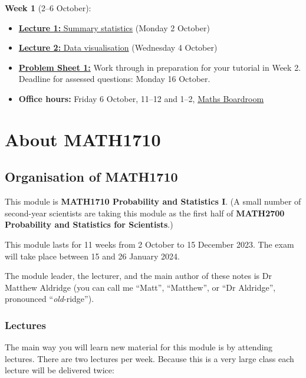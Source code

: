 \documentclass[
  a4paper,
]{book}
\providecommand{\tightlist}{%
  \setlength{\itemsep}{0pt}\setlength{\parskip}{0pt}}
\theoremstyle{definition}
\theoremstyle{definition}
\theoremstyle{definition}
\theoremstyle{definition}
\theoremstyle{remark}
\begin{document}
\textbf{Week 1} (2--6 October):

\begin{itemize}
\tightlist
\item
  \protect\hyperlink{L01-stats}{\textbf{Lecture 1:} Summary statistics} (Monday 2 October)
\item
  \protect\hyperlink{L02-dataviz}{\textbf{Lecture 2:} Data visualisation} (Wednesday 4 October)
\item
  \protect\hyperlink{P1}{\textbf{Problem Sheet 1:}} Work through in preparation for your tutorial in Week 2. Deadline for assessed questions: Monday 16 October.
\item
  \textbf{Office hours:} Friday 6 October, 11--12 and 1--2, \href{boardroom.png}{Maths Boardroom}
\end{itemize}

\hypertarget{about}{%
\chapter*{About MATH1710}\label{about}}

\hypertarget{organisation}{%
\section*{Organisation of MATH1710}\label{organisation}}

This module is \textbf{MATH1710 Probability and Statistics I}. (A small number of second-year scientists are taking this module as the first half of \textbf{MATH2700 Probability and Statistics for Scientists}.)

This module lasts for 11 weeks from 2 October to 15 December 2023. The exam will take place between 15 and 26 January 2024.

The module leader, the lecturer, and the main author of these notes is Dr Matthew Aldridge (you can call me ``Matt'', ``Matthew'', or ``Dr Aldridge'', pronounced ``\emph{old}-ridge'').

\hypertarget{lectures}{%
\subsection*{Lectures}\label{lectures}}

The main way you will learn new material for this module is by attending lectures. There are two lectures per week. Because this is a very large class each lecture will be delivered twice:
\end{document}
